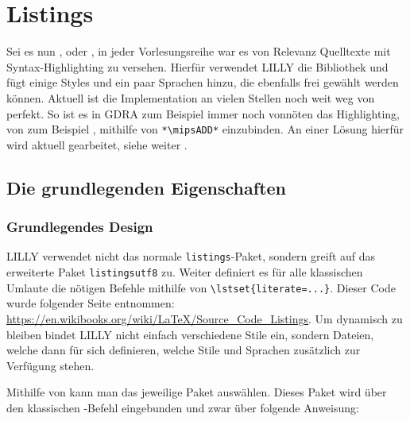 \renewcommand{\arraystretch}{1.5}
\setlength\intextsep{0pt}
\chapter[Listings \LILLYxBOXxVersion{\small 1.0.0}]{Listings}
Sei es nun \fg[], \eidi oder \gdra[], in jeder Vorlesungsreihe war es von Relevanz Quelltexte mit Syntax-Highlighting zu versehen. Hierfür verwendet LILLY die Bibliothek  und fügt einige Styles und ein paar Sprachen hinzu, die ebenfalls frei gewählt werden können. Aktuell ist die Implementation an vielen Stellen noch weit weg von perfekt. So ist es in GDRA zum Beispiel immer noch vonnöten das Highlighting, von zum Beispiel , mithilfe von \verb|*\mipsADD*| einzubinden. An einer Lösung hierfür wird aktuell gearbeitet, siehe weiter .\normalmarginpar
\section{Die grundlegenden Eigenschaften}
\subsection{Grundlegendes Design}
{\centering {}\vspace*{0.5\baselineskip}\par}

LILLY verwendet nicht das normale \verb|listings|-Paket, sondern greift auf das erweiterte Paket \verb|listingsutf8| zu. Weiter definiert es für alle klassischen Umlaute die nötigen Befehle mithilfe von \verb|\lstset{literate=...}|. Dieser Code wurde folgender Seite entnommen: \url{https://en.wikibooks.org/wiki/LaTeX/Source_Code_Listings}.\newline
Um dynamisch zu bleiben bindet LILLY nicht einfach verschiedene Stile ein, sondern Dateien, welche dann für sich definieren, welche Stile und Sprachen zusätzlich zur Verfügung stehen.\par\reversemarginpar
Mithilfe von  kann man das jeweilige Paket auswählen. Dieses Paket wird über den klassischen \verb||-Befehl eingebunden und zwar über folgende Anweisung: 
{\small\begin{lstlisting}[style=latex, breaklines=true]

\end{lstlisting}}

